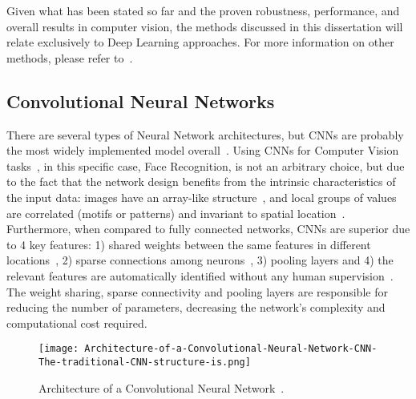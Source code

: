 \documentclass[class=report, crop=false, a4paper, 12pt]{standalone}
\begin{document}
\par Given what has been stated so far and the proven robustness, performance, and overall results in computer vision, the methods discussed in this dissertation will relate exclusively to Deep Learning approaches. For more information on other methods, please refer to~\autocite{learned-millerLabeledFacesWild2016}. 

\subsection{Convolutional Neural Networks}

\par There are several types of Neural Network architectures, but CNNs are probably the most widely implemented model overall~\autocite{yamashitaConvolutionalNeuralNetworks2018, liSurveyConvolutionalNeural2022}. Using CNNs for Computer Vision tasks~\autocite{krizhevskyImageNetClassificationDeep2012,taigmanDeepFaceClosingGap2014,tompsonEfficientObjectLocalization2015, zhangImprovedBreastCancer2021}, in this specific case, Face Recognition, is not an arbitrary choice, but due to the fact that the network design benefits from the intrinsic characteristics of the input data: images have an array-like structure~\autocite{yamashitaConvolutionalNeuralNetworks2018}, and local groups of values are correlated (motifs or patterns) and invariant to spatial location~\autocite{lecunDeepLearning2015,caoReviewNeuralNetworks2018}. Furthermore, when compared to fully connected networks, CNNs are superior due to 4 key features: 1) shared weights between the same features in different locations~\autocite{liSurveyConvolutionalNeural2022}, 2) sparse connections among neurons~\autocite{alzubaidiReviewDeepLearning2021}, 3) pooling layers and 4) the relevant features are automatically identified without any human supervision~\autocite{alzubaidiReviewDeepLearning2021,liSurveyConvolutionalNeural2022}. The weight sharing, sparse connectivity and pooling layers are responsible for reducing the number of parameters, decreasing the network's complexity and computational cost required.

\begin{figure}[H]
    \centering
    \texttt{[image: Architecture-of-a-Convolutional-Neural-Network-CNN-The-traditional-CNN-structure-is.png]}
    \caption[Architecture of a Convolutional Neural Network.]{Architecture of a Convolutional Neural Network~\autocite{kangDeepSimilarityMetric2019}.}
    \label{fig:cnn}
\end{figure}
\end{document}
